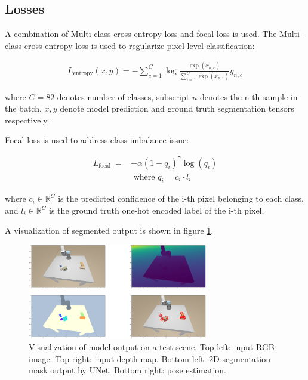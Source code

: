 \documentclass{article}
\begin{document}
\subsection{Losses} %

A combination of Multi-class cross entropy loss and focal loss is used. The Multi-class cross entropy loss is used to regularize pixel-level classification:

\begin{align*}
    L_{\text{entropy}}(x,y)=-\sum_{c=1}^C \log \frac{\exp \left(x_{n, c}\right)}{\sum_{i=1}^C \exp \left(x_{n, i}\right)} y_{n, c}
\end{align*}

where $C=82$ denotes number of classes, subscript $n$ denotes the n-th sample in the batch, $x, y$ denote model 
prediction and ground truth segmentation tensors respectively.

Focal loss is used to address class imbalance issue:

\begin{align*}
    L_{\text {focal }}=&-\alpha\left(1-q_i\right)^\gamma \log \left(q_i\right) \\ & \text { where } q_i=c_i \cdot l_i 
\end{align*}

where $c_i \in \mathbb{R}^C$ is the predicted confidence of the i-th pixel belonging to
each class, and $l_i \in \mathbb{R}^C$ is the ground truth one-hot encoded label of the i-th pixel.

A visualization of segmented output is shown in figure \ref{fig:test_scene}.

\begin{figure}[H]\centering
    \includegraphics[width=0.7\textwidth]{test_scene.png}
    \caption{Visualization of model output on a test scene. Top left: input RGB
    image. Top right: input depth map. Bottom left: 2D segmentation mask output 
    by UNet. Bottom right: pose estimation. \label{fig:test_scene}}
\end{figure}
\end{document}
